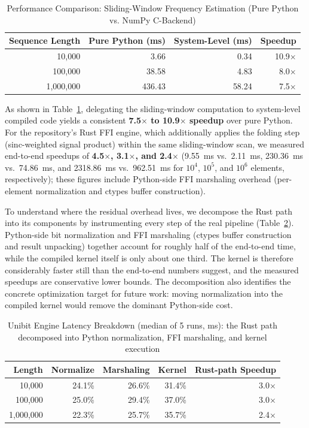 ﻿\documentclass[12pt,a4paper]{article}
\begin{document}
\begin{table}[H]
\centering
\caption{Performance Comparison: Sliding-Window Frequency Estimation (Pure Python vs. NumPy C-Backend)}
\label{tab:performance}
\small
\begin{tabular}{@{}rrrr@{}}
\toprule
\textbf{Sequence Length} & \textbf{Pure Python (ms)} & \textbf{System-Level (ms)} & \textbf{Speedup} \\
\midrule
10,000 & 3.66 & 0.34 & 10.9$\times$ \\
100,000 & 38.58 & 4.83 & 8.0$\times$ \\
1,000,000 & 436.43 & 58.24 & 7.5$\times$ \\
\bottomrule
\end{tabular}
\end{table}

As shown in Table~\ref{tab:performance}, delegating the sliding-window computation to system-level compiled code yields a consistent \textbf{7.5$\times$ to 10.9$\times$ speedup} over pure Python. For the repository's Rust FFI engine, which additionally applies the folding step (sinc-weighted signal product) within the same sliding-window scan, we measured end-to-end speedups of \textbf{4.5$\times$, 3.1$\times$, and 2.4$\times$} (9.55~ms vs.\ 2.11~ms, 230.36~ms vs.\ 74.86~ms, and 2318.86~ms vs.\ 962.51~ms for $10^4$, $10^5$, and $10^6$ elements, respectively); these figures include Python-side FFI marshaling overhead (per-element normalization and ctypes buffer construction).

To understand where the residual overhead lives, we decompose the Rust path into its components by instrumenting every step of the real pipeline (Table~\ref{tab:breakdown}). Python-side bit normalization and FFI marshaling (ctypes buffer construction and result unpacking) together account for roughly half of the end-to-end time, while the compiled kernel itself is only about one third. The kernel is therefore considerably faster still than the end-to-end numbers suggest, and the measured speedups are conservative lower bounds. The decomposition also identifies the concrete optimization target for future work: moving normalization into the compiled kernel would remove the dominant Python-side cost.

\begin{table}[H]
\centering
\caption{Unibit Engine Latency Breakdown (median of 5 runs, ms): the Rust path decomposed into Python normalization, FFI marshaling, and kernel execution}
\label{tab:breakdown}
\small
\begin{tabular}{@{}rrrrr@{}}
\toprule
\textbf{Length} & \textbf{Normalize} & \textbf{Marshaling} & \textbf{Kernel} & \textbf{Rust-path Speedup} \\
\midrule
10,000    & 24.1\% & 26.6\% & 31.4\% & 3.0$\times$ \\
100,000   & 25.0\% & 29.4\% & 37.0\% & 3.0$\times$ \\
1,000,000 & 22.3\% & 25.7\% & 35.7\% & 2.4$\times$ \\
\bottomrule
\end{tabular}
\end{table}
\end{document}
